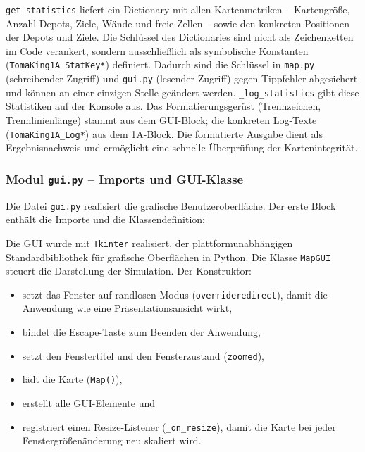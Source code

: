 \texttt{get\_statistics} liefert ein Dictionary mit allen Kartenmetriken – Kartengröße, Anzahl Depots, Ziele, Wände und freie Zellen – sowie den konkreten Positionen der Depots und Ziele. Die Schlüssel des Dictionaries sind nicht als Zeichenketten im Code verankert, sondern ausschließlich als symbolische Konstanten (\texttt{TomaKing1A\_StatKey*}) definiert. Dadurch sind die Schlüssel in \texttt{map.py} (schreibender Zugriff) und \texttt{gui.py} (lesender Zugriff) gegen Tippfehler abgesichert und können an einer einzigen Stelle geändert werden. \texttt{\_log\_statistics} gibt diese Statistiken auf der Konsole aus. Das Formatierungsgerüst (Trennzeichen, Trennlinienlänge) stammt aus dem GUI-Block; die konkreten Log-Texte (\texttt{TomaKing1A\_Log*}) aus dem 1A-Block. Die formatierte Ausgabe dient als Ergebnisnachweis und ermöglicht eine schnelle Überprüfung der Kartenintegrität.


\subsubsection{Modul \texttt{gui.py} – Imports und \acs{GUI}-Klasse}

Die Datei \texttt{gui.py} realisiert die grafische Benutzeroberfläche. Der erste Block enthält die Importe und die Klassendefinition:



Die \acs{GUI} wurde mit \texttt{Tkinter} realisiert, der plattformunabhängigen Standardbibliothek für grafische Oberflächen in Python. Die Klasse \texttt{MapGUI} steuert die Darstellung der Simulation. Der Konstruktor:
\begin{itemize}
    \item setzt das Fenster auf randlosen Modus (\texttt{overrideredirect}), damit die Anwendung wie eine Präsentationsansicht wirkt,
    \item bindet die Escape-Taste zum Beenden der Anwendung,
    \item setzt den Fenstertitel und den Fensterzustand (\texttt{zoomed}),
    \item lädt die Karte (\texttt{Map()}),
    \item erstellt alle \acs{GUI}-Elemente und
    \item registriert einen Resize-Listener (\texttt{\_on\_resize}), damit die Karte bei jeder Fenstergrößenänderung neu skaliert wird.
\end{itemize}

